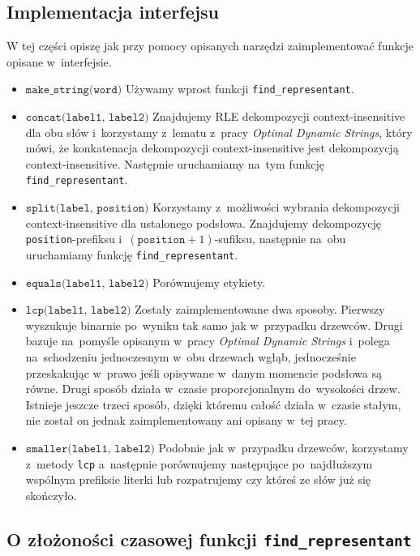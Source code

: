 \documentclass[declaration,shortabstract]{iithesis}
\theoremstyle{definition} \newtheorem{definition}{Definicja}[chapter]
\theoremstyle{remark} \newtheorem{remark}[definition]{Obserwacja}
\theoremstyle{plain} \newtheorem{theorem}[definition]{Twierdzenie}
\theoremstyle{remark} \newtheorem{example}{Przykład}[definition]
\theoremstyle{plain} \newtheorem{lemma}[definition]{Lemat}
\begin{document}
\subsection{Implementacja interfejsu}

W tej części opiszę jak przy pomocy opisanych narzędzi zaimplementować funkcje opisane w~interfejsie.
\begin{itemize}
    \item $\texttt{make\_string(word)}$ Używamy wprost funkcji \texttt{find\_representant}.
    \item $\texttt{concat(label1, label2)}$ Znajdujemy RLE dekompozycji context-insensitive dla obu słów i~korzystamy z~lematu z~pracy \textit{Optimal Dynamic Strings}, który mówi, że konkatenacja dekompozycji context-insensitive jest dekompozycją context-insensitive. Następnie uruchamiamy na~tym funkcję \texttt{find\_representant}.
    \item $\texttt{split(label, position)}$ Korzystamy z~możliwości wybrania dekompozycji context-insensitive dla ustalonego podsłowa. Znajdujemy dekompozycję \texttt{position}-prefiksu i~$(\texttt{position} + 1)$-sufiksu, następnie na~obu uruchamiamy funkcję \texttt{find\_representant}. 
    \item $\texttt{equals(label1, label2)}$ Porównujemy etykiety.
    \item $\texttt{lcp(label1, label2)}$ Zostały zaimplementowane dwa sposoby. Pierwszy wyszukuje binarnie po~wyniku tak samo jak w~przypadku drzewców. Drugi bazuje na~pomyśle opisanym w~pracy \textit{Optimal Dynamic Strings} i~polega na~schodzeniu jednoczesnym w~obu drzewach wgłąb, jednocześnie przeskakując w~prawo jeśli opisywane w~danym momencie podsłowa są równe. Drugi sposób działa w~czasie proporcjonalnym do~wysokości drzew. Istnieje jeszcze trzeci sposób, dzięki któremu całość działa w~czasie stałym, nie został on jednak zaimplementowany ani opisany w~tej pracy.
    \item $\texttt{smaller(label1, label2)}$ Podobnie jak w~przypadku drzewców, korzystamy z~metody \texttt{lcp} a~następnie porównujemy następujące po~najdłuższym wspólnym prefiksie literki lub rozpatrujemy czy któreś ze słów już się skończyło. 
\end{itemize}


\subsection{O złożoności czasowej funkcji \texttt{find\_representant}}
\end{document}
